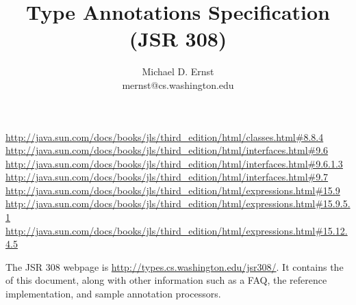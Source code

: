 \documentclass[10pt]{article}
\title{Type Annotations Specification (JSR 308)}
\author{Michael D. Ernst \\
{\ttfamily mernst@cs.washington.edu}
}
\begin{document}
\def\codesize{\smaller}
\newcommand{\code}[1]{\ifmmode{\mbox{\codesize\ttfamily{#1}}}\else{\codesize\ttfamily #1}\fi}
\def\<#1>{\code{#1}}
\newcommand{\myurl}[1]{{\codesize\url{#1}}}




\makeatletter
\def\topfigrule{\kern3\p@ \hrule \kern -3.4\p@} %
\def\botfigrule{\kern-3\p@ \hrule \kern 2.6\p@} %
\def\dblfigrule{\kern3\p@ \hrule \kern -3.4\p@} %
\makeatother


\newcommand{\jlsURL}{http://java.sun.com/docs/books/jls/third_edition/html/}
\urldef{\jlsEightEightFourURL}\url{http://java.sun.com/docs/books/jls/third_edition/html/classes.html#8.8.4}
\urldef{\jlsNineSixURL}\url{http://java.sun.com/docs/books/jls/third_edition/html/interfaces.html#9.6}
\urldef{\jlsNineSixOneThreeURL}\url{http://java.sun.com/docs/books/jls/third_edition/html/interfaces.html#9.6.1.3}
\urldef{\jlsNineSevenURL}\url{http://java.sun.com/docs/books/jls/third_edition/html/interfaces.html#9.7}
\urldef{\jlsFifteenNine}\url{http://java.sun.com/docs/books/jls/third_edition/html/expressions.html#15.9}
\urldef{\jlsFifteenNineFiveOneURL}\url{http://java.sun.com/docs/books/jls/third_edition/html/expressions.html#15.9.5.1}
\urldef{\jlsFifteenTwelveFourFiveURL}\url{http://java.sun.com/docs/books/jls/third_edition/html/expressions.html#15.12.4.5}



\maketitle

The JSR 308 webpage is \myurl{http://types.cs.washington.edu/jsr308/}.
It contains the
of this document, along
with other information such as a FAQ, the reference implementation, and
sample annotation processors.

\end{document}
